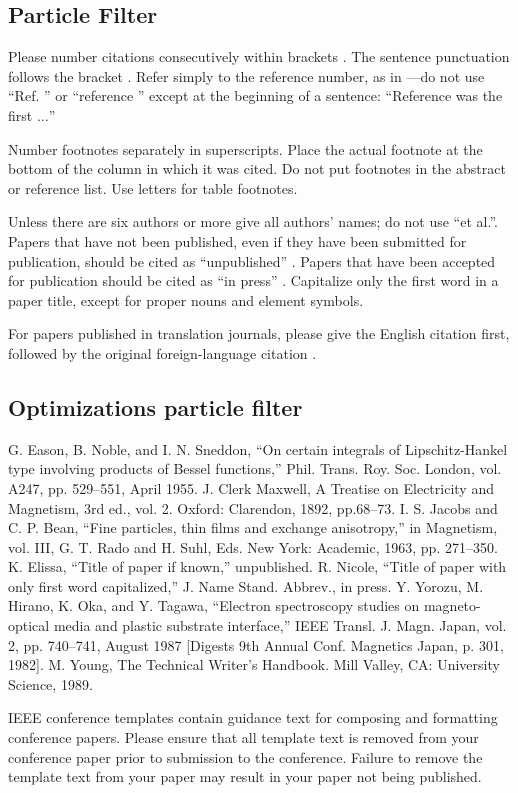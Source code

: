 \documentclass[conference]{IEEEtran}
\begin{document}
\subsection*{Particle Filter}
Please number citations consecutively within brackets \cite{b1}. The 
sentence punctuation follows the bracket \cite{b2}. Refer simply to the reference 
number, as in \cite{b3}---do not use ``Ref. \cite{b3}'' or ``reference \cite{b3}'' except at 
the beginning of a sentence: ``Reference \cite{b3} was the first $\ldots$''

Number footnotes separately in superscripts. Place the actual footnote at 
the bottom of the column in which it was cited. Do not put footnotes in the 
abstract or reference list. Use letters for table footnotes.

Unless there are six authors or more give all authors' names; do not use 
``et al.''. Papers that have not been published, even if they have been 
submitted for publication, should be cited as ``unpublished'' \cite{b4}. Papers 
that have been accepted for publication should be cited as ``in press'' \cite{b5}. 
Capitalize only the first word in a paper title, except for proper nouns and 
element symbols.

For papers published in translation journals, please give the English 
citation first, followed by the original foreign-language citation \cite{b6}.
\subsection*{Optimizations particle filter}
\begin{thebibliography}{00}
 G. Eason, B. Noble, and I. N. Sneddon, ``On certain integrals of Lipschitz-Hankel type involving products of Bessel functions,'' Phil. Trans. Roy. Soc. London, vol. A247, pp. 529--551, April 1955.
 J. Clerk Maxwell, A Treatise on Electricity and Magnetism, 3rd ed., vol. 2. Oxford: Clarendon, 1892, pp.68--73.
 I. S. Jacobs and C. P. Bean, ``Fine particles, thin films and exchange anisotropy,'' in Magnetism, vol. III, G. T. Rado and H. Suhl, Eds. New York: Academic, 1963, pp. 271--350.
 K. Elissa, ``Title of paper if known,'' unpublished.
 R. Nicole, ``Title of paper with only first word capitalized,'' J. Name Stand. Abbrev., in press.
 Y. Yorozu, M. Hirano, K. Oka, and Y. Tagawa, ``Electron spectroscopy studies on magneto-optical media and plastic substrate interface,'' IEEE Transl. J. Magn. Japan, vol. 2, pp. 740--741, August 1987 [Digests 9th Annual Conf. Magnetics Japan, p. 301, 1982].
 M. Young, The Technical Writer's Handbook. Mill Valley, CA: University Science, 1989.
\end{thebibliography}
\vspace{12pt}
\color{red}
IEEE conference templates contain guidance text for composing and formatting conference papers. Please ensure that all template text is removed from your conference paper prior to submission to the conference. Failure to remove the template text from your paper may result in your paper not being published.
\end{document}
